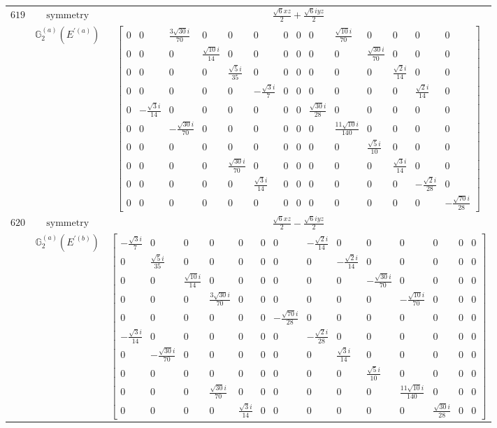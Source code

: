 \documentclass[fleqn,8pt,landscape]{jsarticle}
\begin{document}
\begin{longtable}{ccc}
$ 619 $ & $ \text{symmetry} $ & $ \frac{\sqrt{6} x z}{2} + \frac{\sqrt{6} i y z}{2} $ \\
$  $ & $ \mathbb{G}_{2}^{(a)}(E^{\prime(a)}) $ & $ \begin{bmatrix} 0 & 0 & \frac{3 \sqrt{30} i}{70} & 0 & 0 & 0 & 0 & 0 & 0 & \frac{\sqrt{10} i}{70} & 0 & 0 & 0 & 0 \\ 0 & 0 & 0 & \frac{\sqrt{10} i}{14} & 0 & 0 & 0 & 0 & 0 & 0 & \frac{\sqrt{30} i}{70} & 0 & 0 & 0 \\ 0 & 0 & 0 & 0 & \frac{\sqrt{5} i}{35} & 0 & 0 & 0 & 0 & 0 & 0 & \frac{\sqrt{2} i}{14} & 0 & 0 \\ 0 & 0 & 0 & 0 & 0 & - \frac{\sqrt{3} i}{7} & 0 & 0 & 0 & 0 & 0 & 0 & \frac{\sqrt{2} i}{14} & 0 \\ 0 & - \frac{\sqrt{3} i}{14} & 0 & 0 & 0 & 0 & 0 & 0 & \frac{\sqrt{30} i}{28} & 0 & 0 & 0 & 0 & 0 \\ 0 & 0 & - \frac{\sqrt{30} i}{70} & 0 & 0 & 0 & 0 & 0 & 0 & \frac{11 \sqrt{10} i}{140} & 0 & 0 & 0 & 0 \\ 0 & 0 & 0 & 0 & 0 & 0 & 0 & 0 & 0 & 0 & \frac{\sqrt{5} i}{10} & 0 & 0 & 0 \\ 0 & 0 & 0 & 0 & \frac{\sqrt{30} i}{70} & 0 & 0 & 0 & 0 & 0 & 0 & \frac{\sqrt{3} i}{14} & 0 & 0 \\ 0 & 0 & 0 & 0 & 0 & \frac{\sqrt{3} i}{14} & 0 & 0 & 0 & 0 & 0 & 0 & - \frac{\sqrt{2} i}{28} & 0 \\ 0 & 0 & 0 & 0 & 0 & 0 & 0 & 0 & 0 & 0 & 0 & 0 & 0 & - \frac{\sqrt{70} i}{28} \end{bmatrix} $ \\ \hline
$ 620 $ & $ \text{symmetry} $ & $ \frac{\sqrt{6} x z}{2} - \frac{\sqrt{6} i y z}{2} $ \\
$  $ & $ \mathbb{G}_{2}^{(a)}(E^{\prime(b)}) $ & $ \begin{bmatrix} - \frac{\sqrt{3} i}{7} & 0 & 0 & 0 & 0 & 0 & 0 & - \frac{\sqrt{2} i}{14} & 0 & 0 & 0 & 0 & 0 & 0 \\ 0 & \frac{\sqrt{5} i}{35} & 0 & 0 & 0 & 0 & 0 & 0 & - \frac{\sqrt{2} i}{14} & 0 & 0 & 0 & 0 & 0 \\ 0 & 0 & \frac{\sqrt{10} i}{14} & 0 & 0 & 0 & 0 & 0 & 0 & - \frac{\sqrt{30} i}{70} & 0 & 0 & 0 & 0 \\ 0 & 0 & 0 & \frac{3 \sqrt{30} i}{70} & 0 & 0 & 0 & 0 & 0 & 0 & - \frac{\sqrt{10} i}{70} & 0 & 0 & 0 \\ 0 & 0 & 0 & 0 & 0 & 0 & - \frac{\sqrt{70} i}{28} & 0 & 0 & 0 & 0 & 0 & 0 & 0 \\ - \frac{\sqrt{3} i}{14} & 0 & 0 & 0 & 0 & 0 & 0 & - \frac{\sqrt{2} i}{28} & 0 & 0 & 0 & 0 & 0 & 0 \\ 0 & - \frac{\sqrt{30} i}{70} & 0 & 0 & 0 & 0 & 0 & 0 & \frac{\sqrt{3} i}{14} & 0 & 0 & 0 & 0 & 0 \\ 0 & 0 & 0 & 0 & 0 & 0 & 0 & 0 & 0 & \frac{\sqrt{5} i}{10} & 0 & 0 & 0 & 0 \\ 0 & 0 & 0 & \frac{\sqrt{30} i}{70} & 0 & 0 & 0 & 0 & 0 & 0 & \frac{11 \sqrt{10} i}{140} & 0 & 0 & 0 \\ 0 & 0 & 0 & 0 & \frac{\sqrt{3} i}{14} & 0 & 0 & 0 & 0 & 0 & 0 & \frac{\sqrt{30} i}{28} & 0 & 0 \end{bmatrix} $ \\ \hline

\end{longtable}
\end{document}
